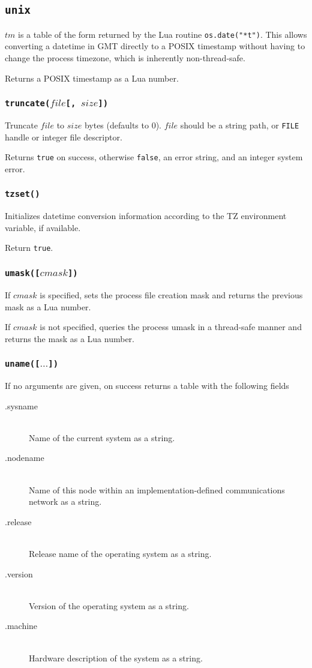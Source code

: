 \documentclass[11pt, oneside]{memoir}
\newcommand*{\true}[0]{\texttt{true}\xspace}
\newcommand*{\false}[0]{\texttt{false}\xspace}
\newcommand*{\fn}[1]{\texttt{#1}\xspace}
\newcommand*{\const}[1]{\texttt{#1}\xspace}
\newcounter{toccols}
\newenvironment{Module}[1]{
	\subsection{\texttt{#1}}
	\addtocontents{toc}{
		\protect\begin{multicols}{\value{toccols}}
	}
}{
	\addtocontents{toc}{\protect\end{multicols}}
}
\begin{document}
\begin{Module}{unix}
$tm$ is a table of the form returned by the Lua routine \fn{os.date("*t")}. This allows converting a datetime in GMT directly to a POSIX timestamp without having to change the process timezone, which is inherently non-thread-safe.

Returns a POSIX timestamp as a Lua number.

\subsubsection[\fn{truncate}]{\fn{truncate($file$[, $size$])}}

Truncate $file$ to $size$ bytes (defaults to 0). $file$ should be a string path, or \const{FILE} handle or integer file descriptor.

Returns \true on success, otherwise \false, an error string, and an integer system error. 

\subsubsection[\fn{tzset}]{\fn{tzset()}}

Initializes datetime conversion information according to the TZ environment variable, if available.

Return \true.

\subsubsection[\fn{umask}]{\fn{umask([$cmask$])}}

If $cmask$ is specified, sets the process file creation mask and returns the previous mask as a Lua number.

If $cmask$ is not specified, queries the process umask in a thread-safe manner and returns the mask as a Lua number.

\subsubsection[\fn{uname}]{\fn{uname([$\ldots$])}}

If no arguments are given, on success returns a table with the following fields

\begin{description}
\item[.sysname] \hfill \\
Name of the current system as a string.
\item[.nodename] \hfill \\
Name of this node within an implementation-defined communications network as a string.
\item[.release] \hfill \\
Release name of the operating system as a string.
\item[.version] \hfill \\
Version of the operating system as a string.
\item[.machine] \hfill \\
Hardware description of the system as a string.
\end{description}


\end{Module}
\end{document}
